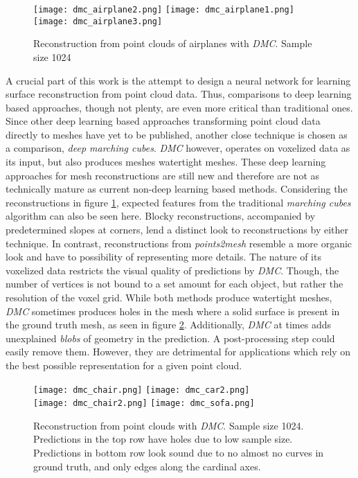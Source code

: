   \begin{figure}[htbp]
    \centering
    \texttt{[image: dmc\_airplane2.png]}
    \texttt{[image: dmc\_airplane1.png]}
    \texttt{[image: dmc\_airplane3.png]}
    \caption{Reconstruction from point clouds of airplanes with \emph{DMC}. Sample size 1024} \label{fig:dmcplanes}
  \end{figure}
  A crucial part of this work is the attempt to design a neural network for learning surface reconstruction from point cloud data. Thus,
  comparisons to deep learning based approaches, though not plenty, are even more critical than traditional ones. 
  Since other deep learning based approaches transforming point cloud data directly to meshes have yet to be published,  another close technique
  is chosen as a comparison, \emph{deep marching cubes}.
  \emph{DMC} however, operates on voxelized data as its input, but also produces meshes watertight meshes. These deep learning approaches for mesh 
  reconstructions are still new and therefore are not as technically mature as current non-deep learning based methods.
  Considering the reconstructions in figure \ref{fig:dmcplanes}, expected features from the traditional \emph{marching cubes} algorithm can
  also be seen here. Blocky reconstructions, accompanied by predetermined slopes at corners, lend a distinct look to reconstructions by either 
  technique. In contrast, reconstructions from \emph{points2mesh} resemble a more organic look and have to possibility of representing more details.
  The nature of its voxelized data restricts the visual quality of predictions by \emph{DMC}. Though, the number of vertices is not bound to a set
  amount for each object, but rather the resolution of the voxel grid. While both methods produce watertight meshes, \emph{DMC} sometimes produces
  holes in the mesh where a solid surface is present in the ground truth mesh, as seen in figure \ref{fig:dmcobjects}. Additionally, \emph{DMC} at 
  times adds unexplained \emph{blobs} of geometry in the prediction. A post-processing step could easily remove them. However, they are detrimental
  for applications which rely on the best possible representation for a given point cloud.
  \begin{figure}[htbp]
    \centering
    \texttt{[image: dmc\_chair.png]}
    \texttt{[image: dmc\_car2.png]}\\
    \texttt{[image: dmc\_chair2.png]}
    \texttt{[image: dmc\_sofa.png]}
    \caption{Reconstruction from point clouds with \emph{DMC}. Sample size 1024. Predictions in the top row have holes due to low sample size.
    Predictions in bottom row look sound due to no almost no curves in ground truth, and only edges along the cardinal axes.} \label{fig:dmcobjects}
  \end{figure}
